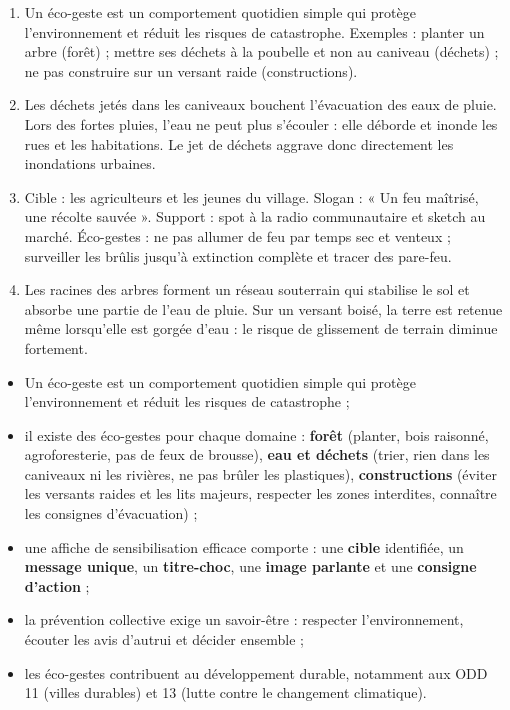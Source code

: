 \documentclass[11pt]{article}
\newcommand{\cle}[1]{{\popxbold\color{popdark}#1}}
\begin{document}
\begin{corrige}
\begin{enumerate}
\item Un éco-geste est un comportement quotidien simple qui protège l'environnement et réduit les risques de catastrophe. Exemples : planter un arbre (forêt) ; mettre ses déchets à la poubelle et non au caniveau (déchets) ; ne pas construire sur un versant raide (constructions).
\item Les déchets jetés dans les caniveaux bouchent l'évacuation des eaux de pluie. Lors des fortes pluies, l'eau ne peut plus s'écouler : elle déborde et inonde les rues et les habitations. Le jet de déchets aggrave donc directement les inondations urbaines.
\item Cible : les agriculteurs et les jeunes du village. Slogan : « Un feu maîtrisé, une récolte sauvée ». Support : spot à la radio communautaire et sketch au marché. Éco-gestes : ne pas allumer de feu par temps sec et venteux ; surveiller les brûlis jusqu'à extinction complète et tracer des pare-feu.
\item Les racines des arbres forment un réseau souterrain qui stabilise le sol et absorbe une partie de l'eau de pluie. Sur un versant boisé, la terre est retenue même lorsqu'elle est gorgée d'eau : le risque de glissement de terrain diminue fortement.
\end{enumerate}
\end{corrige}

\begin{aretenir}
\begin{itemize}
\item Un \cle{éco-geste} est un comportement quotidien simple qui protège l'environnement et réduit les risques de catastrophe ;
\item il existe des éco-gestes pour chaque domaine : \textbf{forêt} (planter, bois raisonné, agroforesterie, pas de feux de brousse), \textbf{eau et déchets} (trier, rien dans les caniveaux ni les rivières, ne pas brûler les plastiques), \textbf{constructions} (éviter les versants raides et les lits majeurs, respecter les zones interdites, connaître les consignes d'évacuation) ;
\item une affiche de sensibilisation efficace comporte : une \textbf{cible} identifiée, un \textbf{message unique}, un \textbf{titre-choc}, une \textbf{image parlante} et une \textbf{consigne d'action} ;
\item la prévention collective exige un savoir-être : respecter l'environnement, écouter les avis d'autrui et décider ensemble ;
\item les éco-gestes contribuent au développement durable, notamment aux ODD 11 (villes durables) et 13 (lutte contre le changement climatique).
\end{itemize}
\end{aretenir}
\end{document}
